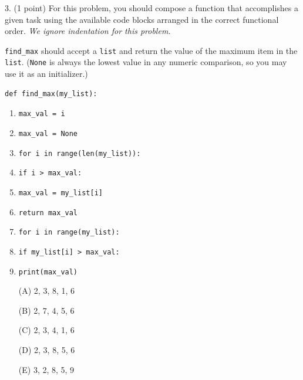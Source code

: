 \documentclass{article}
\begin{document}
\noindent
\begin{minipage}{\textwidth}
3. (1 point)
For this problem, you should compose a function that  accomplishes a given task using the available code blocks arranged in the correct functional order.  \emph{We ignore indentation for this problem.}

\texttt{find\_max} should accept a \texttt{list} and return the value of the maximum item in the \texttt{list}.  (\texttt{None} is always the lowest value in any numeric comparison, so you may use it as an initializer.)

\begin{verbatim}
def find_max(my_list):
\end{verbatim}

\begin{enumerate}[1]
\item \texttt{max\_val = i}
\item \texttt{max\_val = None}
\item \texttt{for i in range(len(my\_list)):}
\item \texttt{if i > max\_val:}
\item \texttt{max\_val = my\_list[i]}
\item \texttt{return max\_val}
\item \texttt{for i in range(my\_list):}
\item \texttt{if my\_list[i] > max\_val:}
\item \texttt{print(max\_val)}
\end{enumerate}


\begin{enumerate}
\item[(A)]
2, 3, 8, 1, 6

\item[(B)]
2, 7, 4, 5, 6

\item[(C)]
2, 3, 4, 1, 6

\item[(D)]
2, 3, 8, 5, 6

\item[(E)]
3, 2, 8, 5, 9

\end{enumerate}
\end{minipage}
\vspace{2em}
\filbreak\vfil{}\vfilneg
\end{document}
